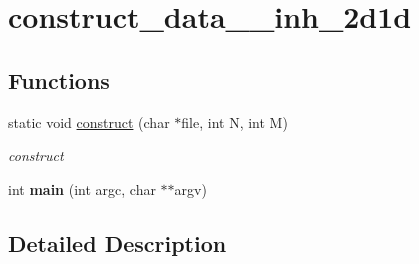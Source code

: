 \hypertarget{group__applications__mri2d__construct__data__inh__2d1d}{\section{construct\-\_\-data\-\_\-\-\_\-inh\-\_\-2d1d}
\label{group__applications__mri2d__construct__data__inh__2d1d}
}
\subsection*{Functions}
\begin{DoxyCompactItemize}
\item 
\hypertarget{group__applications__mri2d__construct__data__inh__2d1d_ga7cad9b408cf07cdd4fa31da9c325dac5}{static void \hyperlink{group__applications__mri2d__construct__data__inh__2d1d_ga7cad9b408cf07cdd4fa31da9c325dac5}{construct} (char $\ast$file, int N, int M)}\label{group__applications__mri2d__construct__data__inh__2d1d_ga7cad9b408cf07cdd4fa31da9c325dac5}

\begin{DoxyCompactList}\small\item\em construct \end{DoxyCompactList}\item 
\hypertarget{group__applications__mri2d__construct__data__inh__2d1d_ga3c04138a5bfe5d72780bb7e82a18e627}{int {\bfseries main} (int argc, char $\ast$$\ast$argv)}\label{group__applications__mri2d__construct__data__inh__2d1d_ga3c04138a5bfe5d72780bb7e82a18e627}

\end{DoxyCompactItemize}


\subsection{Detailed Description}
